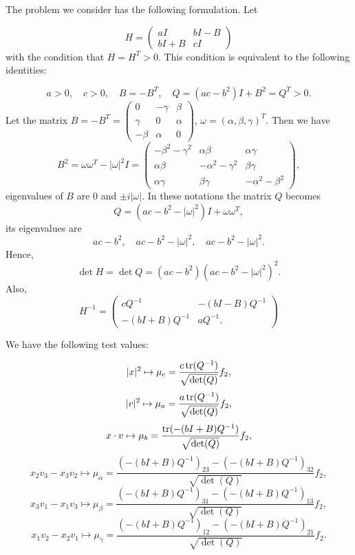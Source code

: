
The problem we consider has the following formulation. Let

\[
    H = \begin{pmatrix}
        aI&bI-B\\bI+B&cI
    \end{pmatrix}
\]
with the condition that $H=H^T>0$. This condition is equivalent to the following identities:

\[
    a>0,\quad c>0,\quad B=-B^T,\quad Q=(ac-b^2)I+B^2=Q^T>0.
\]
Let the matrix $B=-B^T = \begin{pmatrix}
    0& -\gamma&  \beta\\
     \gamma&0&\alpha\\
    -\beta& \alpha&0
\end{pmatrix}$, $\omega = (\alpha,\beta,\gamma)^T$.
Then we have
\[
    B^2
    =\omega \omega^T-|\omega|^2I
    = \begin{pmatrix}
    -\beta^2- \gamma^2& \alpha \beta& \alpha \gamma\\
    \alpha \beta& -\alpha^2- \gamma^2&\beta\gamma\\
    \alpha \gamma&\beta\gamma& -\alpha^2- \beta^2
    \end{pmatrix},
\]
eigenvalues of $B$ are $0$  and $\pm i|\omega|$. %
In these notations the matrix $Q$ becomes
\[
    Q=(ac-b^2-|\omega|^2)I+\omega \omega^T ,
\]
its eigenvalues are 
\[
    ac-b^2,\quad ac-b^2-|\omega|^2,\quad ac-b^2-|\omega|^2.
\]
Hence,
\[
    \det H =\det Q
    =(ac-b^2)(ac-b^2-|\omega|^2)^2.
\]
Also,
\[
    H^{-1}=\begin{pmatrix}
        cQ^{-1}&-(bI-B)Q^{-1}\\-(bI+B)Q^{-1}&aQ^{-1} .
    \end{pmatrix}
\]


We have the  following test values:

\[
    |x|^2\mapsto  \mu_c=\frac{c\operatorname{tr} (Q^{-1}) }{ \sqrt {\det(Q)}}f_2,
\]
\[
    |v|^2\mapsto  \mu_a = \frac{a\operatorname{tr} (Q^{-1}) }{ \sqrt {\det(Q)}}f_2,
\]
\[
    x\cdot v\mapsto  \mu_b=\frac{ \operatorname{tr} (-(bI+B)Q^{-1}) }{ \sqrt {\det(Q)}}f_2,
\]
\[
    x_2 v_3 - x_3 v_2\mapsto \mu_{\alpha} =\frac{   (-(bI+B)Q^{-1})_{23} -(-(bI+B)Q^{-1})_{32}  }{ \sqrt {\det(Q)}}f_2,
\]
\[
    x_3 v_1 - x_1 v_3\mapsto \mu_{\beta} =\frac{   (-(bI+B)Q^{-1})_{31} -(-(bI+B)Q^{-1})_{13}  }{ \sqrt {\det(Q)}}f_2,
\]
\[
    x_1 v_2 - x_2 v_1\mapsto \mu_{\gamma} =\frac{   (-(bI+B)Q^{-1})_{12} -(-(bI+B)Q^{-1})_{21}  }{ \sqrt {\det(Q)}}f_2.
\]

